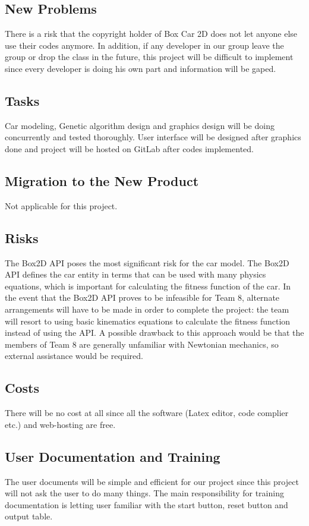 \documentclass[12pt, titlepage]{article}
\begin{document}
\subsection{New Problems}
There is a risk that the copyright holder of Box Car 2D does not let anyone
 else use their codes anymore. In addition, if any developer in our group 
leave the group or drop the class in the future, this project will be 
difficult to implement since every developer is doing his own part and
 information will be gaped.

\subsection{Tasks}
Car modeling, Genetic algorithm design and graphics design will be doing 
concurrently and tested thoroughly. User interface will be designed after 
graphics done and project will be hosted on GitLab after codes implemented.

\subsection{Migration to the New Product}
Not applicable for this project.

\subsection{Risks}
The Box2D API poses the most signiﬁcant risk for the car model. The Box2D 
API deﬁnes the car entity in terms that can be used with many physics 
equations, which is important for calculating the ﬁtness function of the 
car. In the event that the Box2D API proves to be infeasible for Team 8, 
alternate arrangements will have to be made in order to complete the
project: the team will resort to using basic kinematics equations to calculate 
the ﬁtness function instead of using the API. A possible drawback to this 
approach would be that the members of Team 8 are generally unfamiliar with 
Newtonian mechanics, so external assistance would be required. 

\subsection{Costs}
There will be no cost at all since all the software (Latex editor, code 
complier etc.) and web-hosting are free. 

\subsection{User Documentation and Training}
The user documents will be simple and efficient for our project since this 
project will not ask the user to do many things. The main responsibility for 
training documentation is letting user familiar with the start button, reset 
button and output table.
\end{document}
